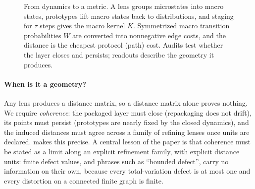 \documentclass[11pt]{article}
\begin{document}
\begin{figure}[t]
\centering
{}
\caption{From dynamics to a metric. A lens groups microstates into macro states, prototypes lift macro states back to distributions, and staging for $\tau$ steps gives the macro kernel $K$. Symmetrized macro transition probabilities $W$ are converted into nonnegative edge costs, and the distance is the cheapest protocol (path) cost. Audits test whether the layer closes and persists; readouts describe the geometry it produces.}
\label{fig:pipeline}
\end{figure}

\paragraph{When is it a geometry?}
Any lens produces a distance matrix, so a distance matrix alone proves nothing.
We require \emph{coherence}: the packaged layer must close (repackaging does not drift), its points must persist (prototypes are nearly fixed by the closed dynamics), and the induced distances must agree across a family of refining lenses once units are declared.
 makes this precise.
A central lesson of the paper is that coherence must be stated as a limit along an explicit refinement family, with explicit distance units: finite defect values, and phrases such as ``bounded defect'', carry no information on their own, because every total-variation defect is at most one and every distortion on a connected finite graph is finite.
\end{document}

